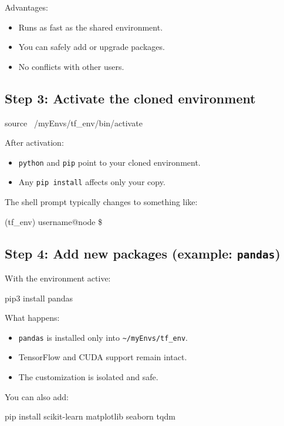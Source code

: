 \documentclass[11pt]{article}
\begin{document}
Advantages:
\begin{itemize}
  \item Runs as fast as the shared environment.
  \item You can safely add or upgrade packages.
  \item No conflicts with other users.
\end{itemize}

\subsection{Step 3: Activate the cloned environment}

\begin{codeblock}
source ~/myEnvs/tf_env/bin/activate
\end{codeblock}

After activation:
\begin{itemize}
  \item \texttt{python} and \texttt{pip} point to your cloned environment.
  \item Any \texttt{pip install} affects only your copy.
\end{itemize}

The shell prompt typically changes to something like:\\
\begin{codeblock}
(tf_env) username@node \$
\end{codeblock}

\subsection{Step 4: Add new packages (example: \texttt{pandas})}

With the environment active:\\
\begin{codeblock}
pip3 install pandas
\end{codeblock}

What happens:
\begin{itemize}
  \item \texttt{pandas} is installed only into \texttt{\textasciitilde/myEnvs/tf\_env}.
  \item TensorFlow and CUDA support remain intact.
  \item The customization is isolated and safe.
\end{itemize}

You can also add:\\
\begin{codeblock}
pip install scikit-learn matplotlib seaborn tqdm
\end{codeblock}
\end{document}
